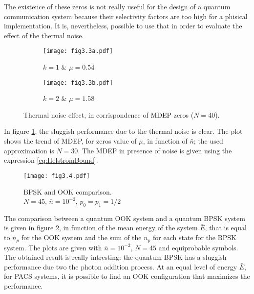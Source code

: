     The existence of these zeros is not really useful for the design of a quantum communication
    system because their selectivity factors are too high for a phisical implementation. It is, 
    nevertheless, possible to use that in order to evaluate the effect of the thermal noise.
    \begin{figure}[ht]
        \begin{subfigure}{0.49\textwidth}
            \texttt{[image: fig3.3a.pdf]}
            \caption{$k=1$ \& $\mu = 0.54$}
        \end{subfigure}
        \begin{subfigure}{0.49\textwidth}
            \texttt{[image: fig3.3b.pdf]}
            \caption{$k=2$ \& $\mu = 1.58$}
        \end{subfigure}
        \caption{Thermal noise effect, in corrispondence of MDEP zeros ($N=40$).}
        \label{fig:3.3}
    \end{figure}
    In figure \ref{fig:3.3}, the sluggish performance due to the thermal noise is clear. The plot
    shows the trend of MDEP, for zeros value of $\mu$, in function of $\bar{n}$; the used approximation
    is $N=30$. The MDEP in presence of noise is given using the expression \ref{eq:HelstromBound}.

    \begin{figure}[ht]
        \texttt{[image: fig3.4.pdf]}
        \caption{BPSK and OOK comparison. \\$N=45$, $\bar{n}=10^{-2}$, $p_0=p_1=1/2$}
        \label{fig:3.4}
    \end{figure}
    The comparison between a quantum OOK system and a quantum BPSK system is given in figure 
    \ref{fig:3.4}, in function of the mean energy of the system $\bar{E}$, that is equal to
    $n_p$ for the OOK system and the sum of the $n_p$ for each state for the BPSK system.
    The plots are given with $\bar{n}= 10^{-2}$, $N=45$ and equiprobable symbols.
    The obtained result is really intresting: the quantum BPSK has a sluggish performance due two 
    the photon addition process. At an equal level of energy $\bar{E}$, for PACS systems, it is
    possible to find an OOK configuration that maximizes the performance.
    